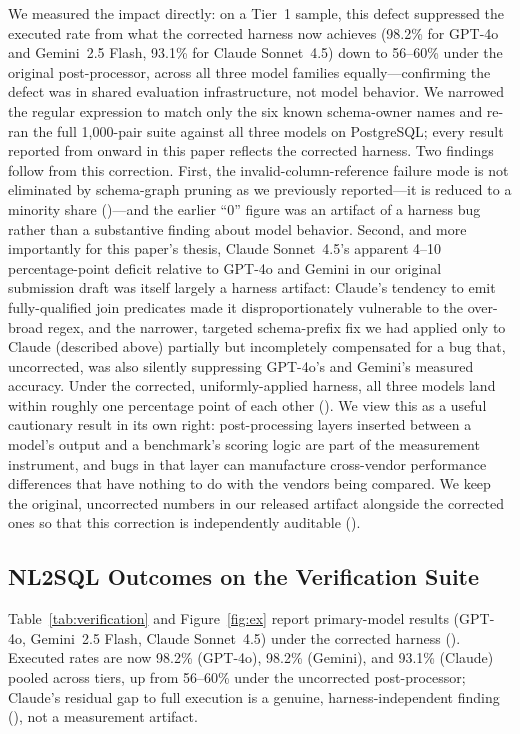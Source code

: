 \documentclass[twocolumn]{svjour3}
\begin{document}
We measured the impact directly: on a Tier~1 sample, this defect suppressed the executed rate from what the corrected harness now achieves (98.2\% for GPT-4o and Gemini~2.5 Flash, 93.1\% for Claude Sonnet~4.5) down to 56--60\% under the original post-processor, across all three model families equally---confirming the defect was in shared evaluation infrastructure, not model behavior.
We narrowed the regular expression to match only the six known schema-owner names and re-ran the full 1{,}000-pair suite against all three models on PostgreSQL; every result reported from  onward in this paper reflects the corrected harness.
Two findings follow from this correction.
First, the invalid-column-reference failure mode is not eliminated by schema-graph pruning as we previously reported---it is reduced to a minority share ()---and the earlier ``0'' figure was an artifact of a harness bug rather than a substantive finding about model behavior.
Second, and more importantly for this paper's thesis, Claude Sonnet~4.5's apparent 4--10 percentage-point deficit relative to GPT-4o and Gemini in our original submission draft was itself largely a harness artifact: Claude's tendency to emit fully-qualified join predicates made it disproportionately vulnerable to the over-broad regex, and the narrower, targeted schema-prefix fix we had applied only to Claude (described above) partially but incompletely compensated for a bug that, uncorrected, was also silently suppressing GPT-4o's and Gemini's measured accuracy.
Under the corrected, uniformly-applied harness, all three models land within roughly one percentage point of each other ().
We view this as a useful cautionary result in its own right: post-processing layers inserted between a model's output and a benchmark's scoring logic are part of the measurement instrument, and bugs in that layer can manufacture cross-vendor performance differences that have nothing to do with the vendors being compared.
We keep the original, uncorrected numbers in our released artifact alongside the corrected ones so that this correction is independently auditable ().

\subsection{NL2SQL Outcomes on the Verification Suite}

Table~\ref{tab:verification} and Figure~\ref{fig:ex} report primary-model results (GPT-4o, Gemini~2.5 Flash, Claude Sonnet~4.5) under the corrected harness ().
Executed rates are now 98.2\% (GPT-4o), 98.2\% (Gemini), and 93.1\% (Claude) pooled across tiers, up from 56--60\% under the uncorrected post-processor; Claude's residual gap to full execution is a genuine, harness-independent finding (), not a measurement artifact.
\end{document}
